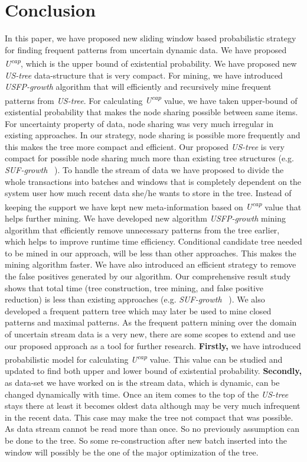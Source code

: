 \documentclass[conference]{IEEEtran}
\begin{document}
\section{Conclusion}
In this paper, we have proposed new sliding window based probabilistic strategy for finding frequent patterns from uncertain dynamic data. We have proposed \emph{U\textsuperscript{cap}}, which is the upper bound of existential probability. We have proposed new \emph{US-tree} data-structure that is very compact. For mining, we have introduced \emph{USFP-growth} algorithm that will efficiently and recursively mine frequent patterns from \emph{US-tree}.
For calculating \emph{U\textsuperscript{cap}} value, we have taken upper-bound of existential probability that makes the node sharing possible between same items. For uncertainty property of data, node sharing was very much irregular in existing approaches. In our strategy, node sharing is possible more frequently and this makes the tree more compact and efficient. Our proposed \emph{US-tree} is very compact for possible node sharing much more than existing tree structures (e.g. \emph{SUF-growth} ~\cite{suf_growth}). To handle the stream of data we have proposed to divide the whole transactions into batches and windows that is completely dependent on the system user how much recent data she/he wants to store in the tree. Instead of keeping the support we have kept new meta-information based on \emph{U\textsuperscript{cap}} value that helps further mining. We have developed new algorithm \emph{USFP-growth} mining algorithm that efficiently remove unnecessary patterns from the tree earlier, which helps to improve runtime time efficiency. Conditional candidate tree needed to be mined in our approach, will be less than other approaches. This makes the mining algorithm faster. We have also introduced an efficient strategy to remove the false positives generated by our algorithm. Our comprehensive result study shows that total time (tree construction, tree mining, and false positive reduction) is less than existing approaches (e.g. \emph{SUF-growth} ~\cite{suf_growth}). We also developed a frequent pattern tree which may later be used to mine closed patterns and maximal patterns.
As the frequent pattern mining over the domain of uncertain stream data is a very new, there are some scopes to extend and use our proposed approach as a tool for further research.
\textbf{Firstly,} we have introduced probabilistic model for calculating \emph{U\textsuperscript{cap}} value. This value can be studied and updated to find both upper and lower bound of existential probability.
\textbf{Secondly,} as data-set we have worked on is the stream data, which is dynamic, can be changed dynamically with time. Once an item comes to the top of the \emph{US-tree} stays there at least it becomes oldest data although may be very much infrequent in the recent data. This case may make the tree not compact that was possible. As data stream cannot be read more than once. So no previously assumption can be done to the tree. So some re-construction after new batch inserted into the window will possibly be the one of the major optimization of the tree.
\end{document}
